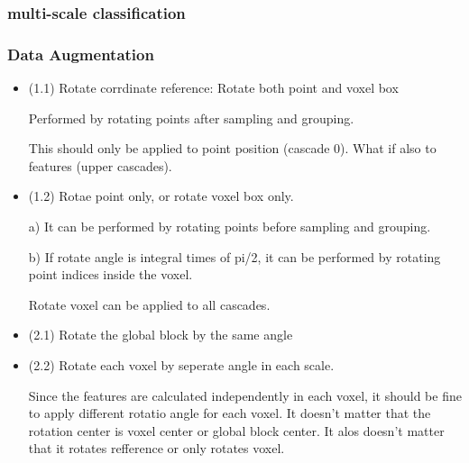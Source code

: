 \documentclass[,table,dvipsnames]{article}
\begin{document}
\subsubsection{multi-scale classification}



\subsubsection{Data Augmentation} 
\begin{itemize}
\item (1.1) Rotate corrdinate reference: Rotate both point and voxel box \par
Performed by rotating points after sampling and grouping. \par
This should only be applied to point position (cascade 0). What if also to features (upper cascades).

\item (1.2) Rotae point only, or rotate voxel box only. \par
a) It can be performed by rotating points before sampling and grouping.\par
b) If rotate angle is integral times of pi/2, it can be performed by rotating point indices inside the voxel.\par
Rotate voxel can be applied to all cascades.
\item (2.1) Rotate the global block by the same angle
\item (2.2) Rotate each voxel by seperate angle in each scale.\par
Since the features are calculated independently in each voxel, it should be fine to apply different rotatio angle for each voxel. It doesn't matter that the rotation center is voxel center or global block center. It alos doesn't matter that it rotates refference or only rotates voxel.

\end{itemize}
\end{document}
